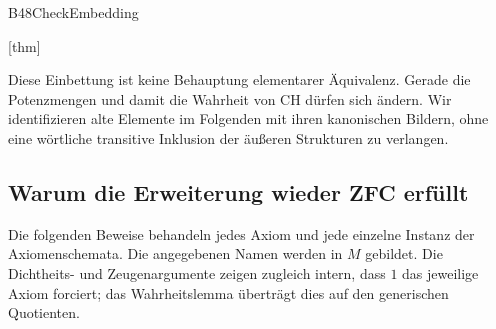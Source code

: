 {B48CheckEmbedding}{
}
\begin{tabproof}
 {}
 {[thm]}
\end{tabproof}
\noindent
Diese Einbettung ist keine Behauptung elementarer Äquivalenz.
Gerade die Potenzmengen und damit die Wahrheit von CH dürfen sich
ändern. Wir identifizieren alte Elemente im Folgenden mit ihren
kanonischen Bildern, ohne eine wörtliche transitive Inklusion
der äußeren Strukturen zu verlangen.

\subsection{Warum die Erweiterung wieder ZFC erfüllt}

Die folgenden Beweise behandeln jedes Axiom und jede einzelne
Instanz der Axiomenschemata. Die angegebenen Namen werden in \(M\)
gebildet. Die Dichtheits- und Zeugenargumente zeigen zugleich
intern, dass \(1\) das jeweilige Axiom forciert; das Wahrheitslemma
überträgt dies auf den generischen Quotienten.

